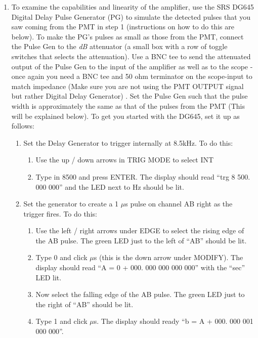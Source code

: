 \documentclass{../lab}
\begin{document}
\begin{enumerate}
    \item To examine the capabilities and linearity of the amplifier, use the SRS DG645 Digital Delay Pulse Generator (PG) to simulate the detected pulses that you saw coming from the PMT in step 1 (instructions on how to do this are below). To make the PG's pulses as small as those from the PMT, connect the Pulse Gen to the \emph{dB} attenuator (a small box with a row of toggle switches that selects the attenuation). Use a BNC tee to send the attenuated output of the Pulse Gen to the input of the amplifier as well as to the scope - once again you need a BNC tee and 50 ohm terminator on the scope-input to match impedance (Make sure you are not using the PMT OUTPUT signal but rather Digital Delay Generator) . Set the Pulse Gen such that the pulse width is approximately the same as that of the pulses from the PMT (This will be explained below). To get you started with the DG645, set it up as follows:
    \begin{enumerate}
        \item Set the Delay Generator to trigger internally at 8.5kHz. To do this:
        \begin{enumerate}
            \item Use the up / down arrows in TRIG MODE to select INT

            \item Type in 8500 and press ENTER. The display should read ``trg 8 500. 000 000'' and the LED next to Hz should be lit.

        \end{enumerate}

        \item Set the generator to create a 1 $\mu$s pulse on channel AB right as the trigger fires. To do this:
        \begin{enumerate}
            \item Use the left / right arrows under EDGE to select the rising edge of the AB pulse. The green LED just to the left of ``AB'' should be lit.

            \item Type 0 and click $\mu$s (this is the down arrow under MODIFY). The display should read ``A = 0 + 000. 000 000 000 000'' with the ``sec'' LED lit.

            \item Now select the falling edge of the AB pulse. The green LED just to the right of ``AB'' should be lit.

            \item Type 1 and click $\mu$s. The display should ready ``b = A + 000. 000 001 000 000''.


\end{enumerate}
\end{enumerate}
\end{enumerate}
\end{document}
